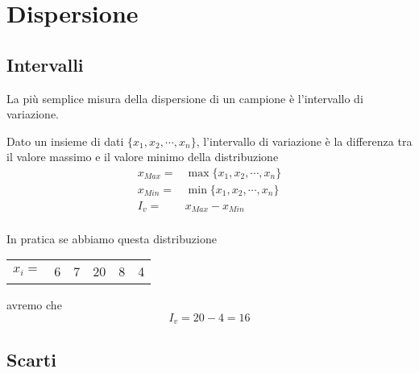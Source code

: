 \chapter{Dispersione}
\section{Intervalli}
La più semplice misura della dispersione di un campione è l'intervallo di variazione.
\begin{defn}
	Dato un insieme di dati  $\lbrace x_{1},x_{2},\cdots,x_{n}\rbrace$, l'intervallo di variazione è la differenza tra il valore massimo e il valore minimo della distribuzione 
	\begin{align*}
	x_{Max}=&\max\lbrace x_{1},x_{2},\cdots,x_{n}\rbrace\\
	x_{Min}=&\min\lbrace x_{1},x_{2},\cdots,x_{n}\rbrace\\
	I_v=&x_{Max}-x_{Min}\\
	\end{align*}
\end{defn}
In pratica se abbiamo questa distribuzione
\begin{center}
	\begin{tabular}{l*{2} {S[table-format=1.0]}S[table-format=2.0]*{2} {S[table-format=1.0]}}
		{$x_{i}=$}	&6  &7  &20  &8  &4 \\  
	\end{tabular}
\end{center}
avremo che \[I_v=20-4=16\]
\section{Scarti}
